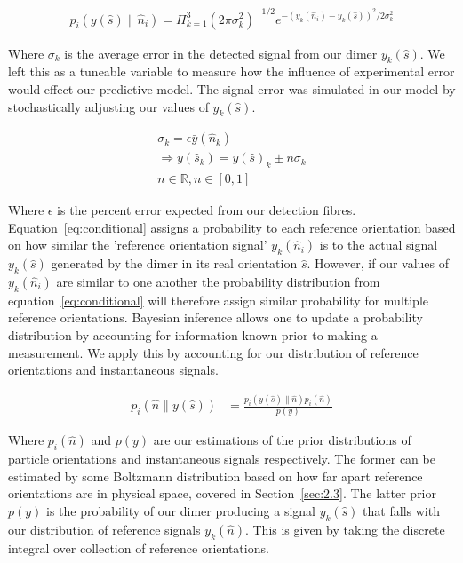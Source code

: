 \documentclass[final, 3p]{elsarticle}
\begin{document}
\begin{align}
	\label{eq:conditional}
	p_i(y(\hat{s})\parallel\hat{n}_i) = \Pi^3_{k=1}
	(2\pi\sigma_k^2)^{-1/2} 
	e^{-(y_{k}(\hat{n}_i)-y_{k}(\hat{s}))^2/2\sigma_k^2}
\end{align}

Where $\sigma_k$ is the average error in the detected signal from our dimer $y_k(\hat{s})$. We left this as a tuneable variable to measure how the influence of experimental error would effect our predictive model. The signal error was simulated in our model by stochastically adjusting our values of $y_k(\hat{s})$. 

\begin{eqnarray*}
	\sigma_k = \epsilon\bar{y}(\hat{n}_k) \\
	\Rightarrow y(\hat{s}_k) = y(\hat{s})_k \pm n\sigma_k \\ 
	n \in \mathbb{R}, n\in[0,1]
\end{eqnarray*} 

Where $\epsilon$ is the percent error expected from our detection fibres. Equation~\eqref{eq:conditional} assigns a probability to each reference orientation based on how similar the 'reference orientation signal' $y_{k}(\hat{n}_i)$ is to the actual signal $y_{k}(\hat{s})$ generated by the dimer in its real orientation $\hat{s}$. However, if our values of $y_k(\hat{n}_i)$ are similar to one another the probability distribution from equation~\ref{eq:conditional} will therefore assign similar probability for multiple reference orientations. Bayesian inference allows one to update a probability distribution by accounting for information known prior to making a measurement. We apply this by accounting for our distribution of reference orientations and instantaneous signals.  

\begin{align}
	\label{eq:bayes}
	p_i(\hat{n}\parallel y(\hat{s}))&= \frac{p_i(y(\hat{s})\parallel\hat{n})p_i(\hat{n})}{p(y)}
\end{align}

Where $p_i(\hat{n})$ and $p(y)$ are our estimations of the prior distributions of particle orientations and instantaneous signals respectively. The former can be estimated by some Boltzmann distribution based on how far apart reference orientations are in physical space, covered in Section~\ref{sec:2.3}. The latter prior $p(y)$ is the probability of our dimer producing a signal $y_k(\hat{s})$ that falls with our distribution of reference signals $y_k(\hat{n})$. This is given by taking the discrete integral over collection of reference orientations. 
\end{document}
